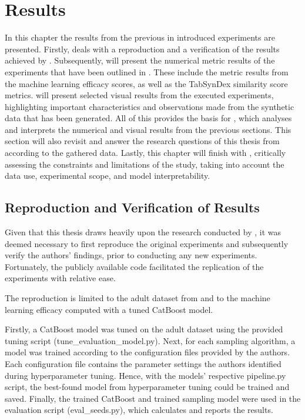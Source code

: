\chapter{Results}
\label{ch:results}

In this chapter the results from the previous in  introduced experiments are presented.
Firstly,  deals with a reproduction and a verification of the results achieved by \textcite{kotelnikov2022TabDDPMModellingTabular}.
Subsequently,  will present the numerical metric results of the experiments that have been outlined in .
These include the metric results from the machine learning efficacy scores, as well as the TabSynDex similarity score metrics.
 will present selected visual results from the executed experiments, highlighting important characteristics and observations made from the synthetic data that has been generated.
All of this provides the basis for , which analyses and interprets the numerical and visual results from the previous sections.
This section will also revisit and answer the research questions of this thesis from  according to the gathered data.
Lastly, this chapter will finish with , critically assessing the constraints and limitations of the study, taking into account the data use, experimental scope, and \gls{model} interpretability.

\section{Reproduction and Verification of Results}
\label{ch:results-reproduction}

Given that this thesis draws heavily upon the research conducted by \cite{kotelnikov2022TabDDPMModellingTabular},
it was deemed necessary to first reproduce the original experiments and subsequently verify the authors' findings,
prior to conducting any new experiments.
Fortunately, the publicly available code \cite{akim2023TabDDPMModellingTabular} facilitated the replication of the experiments with relative ease.

The reproduction is limited to the adult dataset from  and to the machine learning efficacy computed with a tuned CatBoost \cite{prokhorenkova2018CatBoostUnbiasedBoosting} \gls{model}.

Firstly, a CatBoost \gls{model} was tuned on the adult dataset using the provided tuning script (tune\_evaluation\_model.py).
Next, for each sampling algorithm, a \gls{model} was trained according to the configuration files provided by the authors.
Each configuration file contains the parameter settings the authors identified during hyperparameter tuning.
Hence, with the models' respective pipeline.py script, the best-found \gls{model} from hyperparameter tuning could be trained and saved.
Finally, the trained CatBoost and trained sampling \gls{model} were used in the evaluation script (eval\_seeds.py), which calculates and reports the results.

